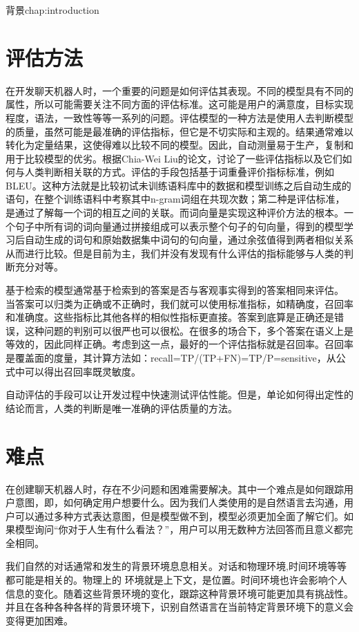 \begin{cuzchapter}{背景}{chap:introduction}
\section{评估方法}\label{sec:background}
在开发聊天机器人时，一个重要的问题是如何评估其表现。不同的模型具有不同的属性，所以可能需要关注不同方面的评估标准。这可能是用户的满意度，目标实现程度，语法，一致性等等一系列的问题。评估模型的一种方法是使用人去判断模型的质量，虽然可能是最准确的评估指标，但它是不切实际和主观的。结果通常难以转化为定量结果，这使得难以比较不同的模型。因此，自动测量易于生产，复制和用于比较模型的优劣。根据Chia-Wei Liu的论文\cite{DBLP:journals/corr/LiuLSNCP16}，讨论了一些评估指标以及它们如何与人类判断相关联的方式。评估的手段包括基于词重叠评价指标标准，例如BLEU。这种方法就是比较初试未训练语料库中的数据和模型训练之后自动生成的语句，在整个训练语料中考察其中n-gram词组在共现次数；第二种是评估标准，是通过了解每一个词的相互之间的关联。而词向量是实现这种评价方法的根本。一个句子中所有词的词向量通过拼接组成可以表示整个句子的句向量，得到的模型学习后自动生成的词句和原始数据集中词句的句向量，通过余弦值得到两者相似关系从而进行比较。但是目前为主，我们并没有发现有什么评估的指标能够与人类的判断充分对等。

基于检索的模型通常基于检索到的答案是否与客观事实得到的答案相同来评估\cite{DBLP:journals/corr/LiuLSNCP16}。 当答案可以归类为正确或不正确时，我们就可以使用标准指标，如精确度，召回率和准确度\cite{Goodfellow-et-al-2016}。这些指标比其他各样的相似性指标更直接。答案到底算是正确还是错误，这种问题的判别可以很严也可以很松。在很多的场合下，多个答案在语义上是等效的，因此同样正确。考虑到这一点，最好的一个评估指标就是召回率。召回率是覆盖面的度量，其计算方法如：recall=TP/(TP+FN)=TP/P=sensitive，从公式中可以得出召回率既灵敏度。

自动评估的手段可以让开发过程中快速测试评估性能。但是，单论如何得出定性的结论而言，人类的判断是唯一准确的评估质量的方法。
\section{难点}\label{sec:background}
在创建聊天机器人时，存在不少问题和困难需要解决。其中一个难点是如何跟踪用户意图，即，如何确定用户想要什么\cite{DBLP:journals/corr/KannanKRKTMCLGY16}。因为我们人类使用的是自然语言去沟通，用户可以通过多种方式表达意图，但是模型做不到，模型必须更加全面了解它们。如果模型询问“你对于人生有什么看法？”，用户可以用无数种方法回答而且意义都完全相同。 

我们自然的对话通常和发生的背景环境息息相关\cite{DBLP:journals/corr/ShangLL15}。对话和物理环境,时间环境等等都可能是相关的。物理上的
环境就是上下文，是位置。时间环境也许会影响个人信息的变化。随着这些背景环境的变化，跟踪这种背景环境可能更加具有挑战性。 并且在各种各种各样的背景环境下，识别自然语言在当前特定背景环境下的意义会变得更加困难。


\end{cuzchapter}
